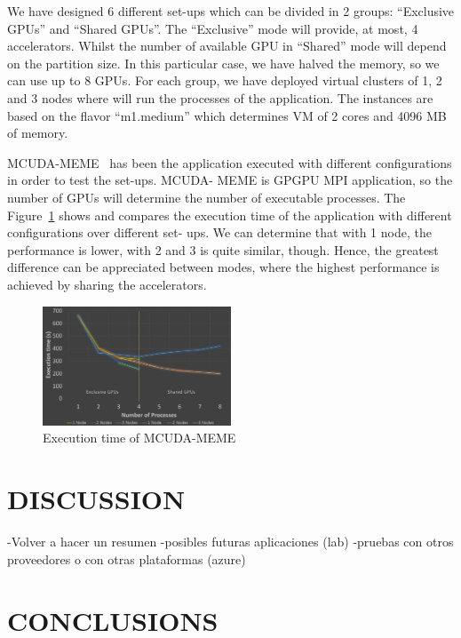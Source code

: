 \documentclass[a4paper,twoside]{article}
\begin{document}
We have designed 6 different set-ups which can be divided
in 2 groups: “Exclusive GPUs” and “Shared GPUs”. The
“Exclusive” mode will provide, at most, 4 accelerators. Whilst
the number of available GPU in “Shared” mode will depend
on the partition size. In this particular case, we have halved
the memory, so we can use up to 8 GPUs. For each group, we
have deployed virtual clusters of 1, 2 and 3 nodes where will
run the processes of the application. The instances are based
on the flavor “m1.medium” which determines VM of 2 cores
and 4096 MB of memory.

MCUDA-MEME~\cite{Liu2010} has been the application executed with
different configurations in order to test the set-ups. MCUDA-
MEME is GPGPU MPI application, so the number of GPUs
will determine the number of executable processes.
The Figure~\ref{fig3} shows and compares the execution time of
the application with different configurations over different set-
ups. We can determine that with 1 node, the performance is
lower, with 2 and 3 is quite similar, though. Hence, the greatest
difference can be appreciated between modes, where the
highest performance is achieved by sharing the accelerators.

\begin{figure}[htb]
  \centering
  \includegraphics[width=0.5\textwidth]{images/chart.jpg}
  \caption{Execution time of MCUDA-MEME}
  \label{fig3}
\end{figure}

\section{\uppercase{Discussion}}
\label{sec:discussion}
-Volver a hacer un resumen
-posibles futuras aplicaciones (lab)
-pruebas con otros proveedores o con otras plataformas (azure)

\section{\uppercase{Conclusions}}
\label{sec:conclusions}
\end{document}

